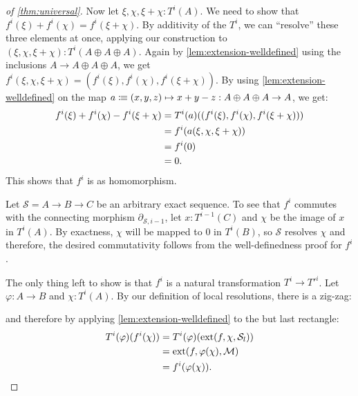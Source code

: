 \begin{proof}[of \cref{thm:universal}]
  Now let $\xi,\chi,\xi+\chi:T^i(A)$.
  We need to show that $f^i(\xi)+f^i(\chi)=f^i(\xi+\chi)$.
  By additivity of the $T^i$,
  we can ``resolve'' these three elements at once, applying our construction to $(\xi,\chi,\xi+\chi):T^i(A\oplus A\oplus A)$.
  Again by \cref{lem:extension-welldefined} using the inclusions $A\to A\oplus A\oplus A$,
  we get $f^i(\xi,\chi,\xi+\chi)=(f^i(\xi),f^i(\chi),f^i(\xi+\chi))$.
  By using \cref{lem:extension-welldefined} on the map $a\vcentcolon\mspace{-1.2mu}\equiv (x,y,z)\mapsto x+y-z:A\oplus A\oplus A\to A$, we get:
  \begin{align*}
    f^i(\xi)+f^i(\chi)-f^i(\xi+\chi) &=T^i(a)((f^i(\xi),f^i(\chi),f^i(\xi+\chi))) \\
                                     &=f^i(a(\xi,\chi,\xi+\chi)) \\
                                     &=f^i(0) \\
                                     &=0
                                       \rlap{.}
  \end{align*}
  This shows that $f^i$ is as homomorphism.
  
  Let $\mathcal{S}=A\to B\to C$ be an arbitrary exact sequence.
  To see that $f^i$ commutes with the connecting morphism $\partial_{\mathcal{S},i-1}$,
  let $x:T^{i-1}(C)$ and $\chi$ be the image of $x$ in $T^i(A)$.
  By exactness, $\chi$ will be mapped to 0 in $T^i(B)$, so $\mathcal{S}$
  resolves $\chi$ and therefore, the desired commutativity follows from the well-definedness proof for $f^i$.
  
  The only thing left to show
  is that $f^i$ is a natural transformation $T^i\to T'^i$.
  Let $\varphi:A\to B$ and $\chi:T^i(A)$.
  By our definition of local resolutions,
  there is a zig-zag:
  \begin{center}
  \end{center}
  and therefore by applying \cref{lem:extension-welldefined} to the but last rectangle:
  \begin{align*}
    T^i(\varphi)(f^i(\chi)) &= T^i(\varphi)(\mathrm{ext}(f,\chi,\mathcal{S}_l)) \\
                            &=\mathrm{ext}(f,\varphi(\chi),\mathcal{M}) \\
                            &=f^i(\varphi(\chi))
                              \rlap{.}
  \end{align*}
\end{proof}
